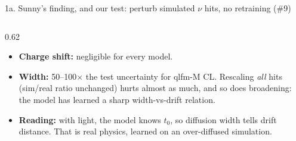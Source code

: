 \documentclass[aspectratio=169,10pt]{beamer}
\newcommand{\iss}[1]{{\color{blue!60!black}\##1}}
\begin{document}
\begin{frame}{1a. Sunny's finding, and our test: perturb simulated $\nu$ hits, no retraining (\iss{9})}
\begin{columns}[T]
\begin{column}{0.62\textwidth}
\begin{itemize}
        \item \textbf{Charge shift:} negligible for every model.
        \item \textbf{Width:} 50--100$\times$ the test uncertainty for qlfm-M CL.
          Rescaling \emph{all} hits (sim/real ratio unchanged) hurts almost as much, and so does broadening:
          the model has learned a sharp width-vs-drift relation.
        \item \textbf{Reading:} with light, the model knows $t_0$, so diffusion width tells drift distance. That is real physics, learned on an over-diffused simulation.
      \end{itemize}
    \end{column}
  \end{columns}
\end{frame}
\end{document}
